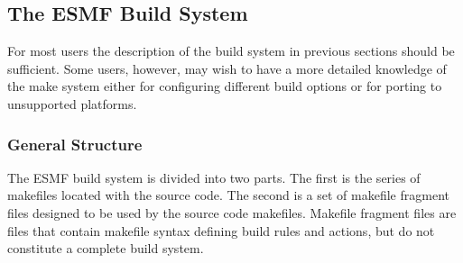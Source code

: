 

\subsection{The ESMF Build System}
\label{sec:make}
For most users the description of the build system in previous
sections should be sufficient.  Some users, however, may wish to have
a more detailed knowledge of the make system either for configuring
different build options or for porting to unsupported platforms.

\subsubsection{General Structure}

The ESMF build system is divided into two parts.  The first is the
series of makefiles located with the source code.  The second is a set
of makefile fragment files designed to be used by the source code
makefiles.  Makefile fragment files are files that contain makefile
syntax defining build rules and actions, but do not constitute a
complete build system.

